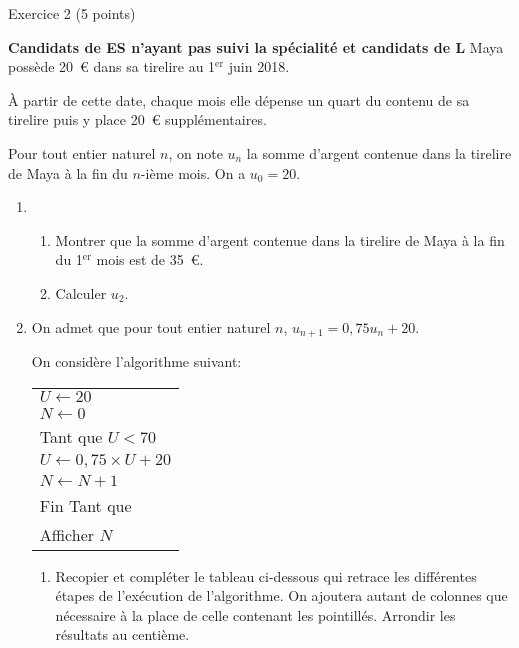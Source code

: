 
\begin{h2}Exercice 2 (5 points)\end{h2}
\textbf{Candidats de ES n'ayant pas suivi la spécialité et candidats de L}
\medskip
Maya possède 20~\euro{} dans sa tirelire au 1${^\text{er}}$ juin 2018.
\par
À partir de cette date, chaque mois elle dépense un quart du contenu de sa tirelire puis y place 20~\euro{} supplémentaires.
\par
Pour tout entier naturel $n$, on note $u_n$ la somme d'argent contenue dans la tirelire de Maya à la fin du $n$-ième mois. On a $u_0=20$.
\begin{enumerate}
     \item
     \begin{enumerate}[label=\alph*.]
          \item Montrer que la somme d'argent contenue dans la tirelire de Maya à la fin du 1${^\text{er}}$ mois est de 35~\euro.
          \item Calculer $u_2$.
     \end{enumerate}
     \item On admet que pour tout entier naturel $n$, $u_{n+1}=0,75 u_n + 20$.
     \par
     On considère l'algorithme suivant:
     \begin{center}
          \begin{extern}%
               \begin{tabularx}{0.5\linewidth}{|X|}
                    \hline
                    $U \longleftarrow 20$\\
                    $N \longleftarrow 0$\\
                    Tant que $U < 70$\\
                    \hspace*{1cm} $U \longleftarrow 0,75 \times U + 20$\\
                    \hspace*{1cm} $N \longleftarrow N+1$\\
                    Fin Tant que\\
                    Afficher $N$\\
                    \hline
               \end{tabularx}
          \end{extern}
     \end{center}
     \begin{enumerate}[label=\alph*.]
          \item Recopier et compléter le tableau ci-dessous qui retrace les différentes étapes de l'exécution de l'algorithme. On ajoutera autant de colonnes que nécessaire à la place de celle contenant les pointillés. Arrondir les résultats au centième.

\end{enumerate}
\end{enumerate}

